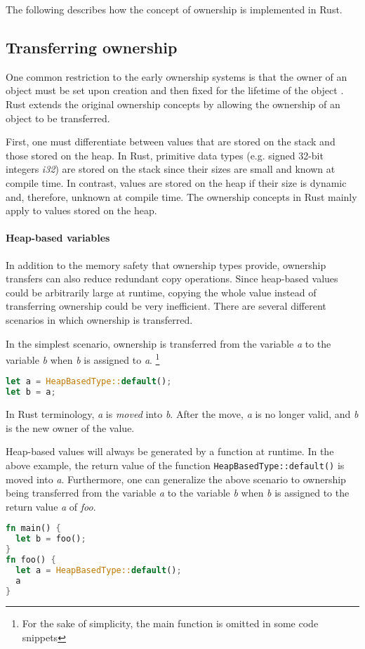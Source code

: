 \documentclass[sigplan,11pt,nonacm]{acmart}
\begin{document}
The following describes how the concept of ownership is implemented in Rust.


\subsection{Transferring ownership}
\label{sec:rust-transferring-ownership}

One common restriction to the early ownership systems is that the owner of an object must be set upon creation and then fixed for the lifetime of the object \cite{ownership-types-survey}.
Rust extends the original ownership concepts by allowing the ownership of an object to be transferred.

First, one must differentiate between values that are stored on the stack and those stored on the heap.
In Rust, primitive data types (e.g. signed 32-bit integers \emph{i32}) are stored on the stack since their sizes are small and known at compile time.
In contrast, values are stored on the heap if their size is dynamic and, therefore, unknown at compile time.
The ownership concepts in Rust mainly apply to values stored on the heap.

\paragraph{Heap-based variables}

In addition to the memory safety that ownership types provide, ownership transfers can also reduce redundant copy operations.
Since heap-based values could be arbitrarily large at runtime, copying the whole value instead of transferring ownership could be very inefficient.
There are several different scenarios in which ownership is transferred.

In the simplest scenario, ownership is transferred from the variable \emph{a} to the variable \emph{b} when \emph{b} is assigned to \emph{a}.
\footnote{For the sake of simplicity, the main function is omitted in some code snippets}

\begin{lstlisting}[language=Rust]
let a = HeapBasedType::default();
let b = a;
\end{lstlisting}
In Rust terminology, \emph{a} is \emph{moved} into \emph{b}.
After the move, \emph{a} is no longer valid, and \emph{b} is the new owner of the value.

Heap-based values will always be generated by a function at runtime.
In the above example, the return value of the function \verb|HeapBasedType::default()| is moved into \emph{a}.
Furthermore, one can generalize the above scenario to ownership being transferred from the variable \emph{a} to the variable \emph{b} when \emph{b} is assigned to the return value \emph{a} of \emph{foo}.
\begin{lstlisting}[language=Rust]
fn main() {
  let b = foo();
}
fn foo() {
  let a = HeapBasedType::default();
  a
}
\end{lstlisting}
\end{document}
